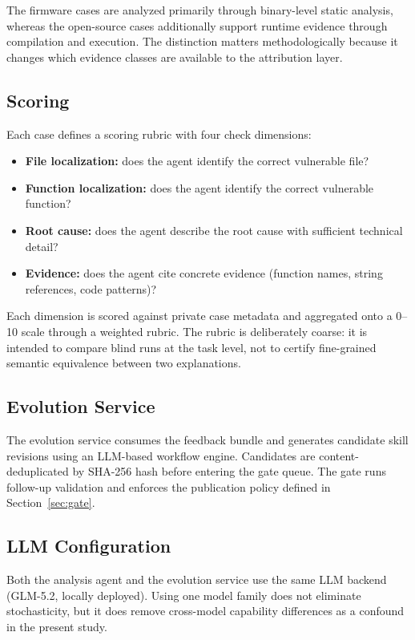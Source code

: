 ﻿\documentclass[preprint,12pt]{elsarticle}
\begin{document}
The firmware cases are analyzed primarily through binary-level static
analysis, whereas the open-source cases additionally support runtime
evidence through compilation and execution.  The distinction matters
methodologically because it changes which evidence classes are available to
the attribution layer.

\subsection{Scoring}

Each case defines a scoring rubric with four check dimensions:
\begin{itemize}[leftmargin=*]
    \item \textbf{File localization:} does the agent identify the correct
    vulnerable file?
    \item \textbf{Function localization:} does the agent identify the
    correct vulnerable function?
    \item \textbf{Root cause:} does the agent describe the root cause with
    sufficient technical detail?
    \item \textbf{Evidence:} does the agent cite concrete evidence
    (function names, string references, code patterns)?
\end{itemize}
Each dimension is scored against private case metadata and aggregated onto a
0--10 scale through a weighted rubric.  The rubric is deliberately coarse:
it is intended to compare blind runs at the task level, not to certify
fine-grained semantic equivalence between two explanations.

\subsection{Evolution Service}

The evolution service consumes the feedback bundle and generates candidate
skill revisions using an LLM-based workflow engine.  Candidates are
content-deduplicated by SHA-256 hash before entering the gate queue.  The
gate runs follow-up validation and enforces the publication policy defined
in Section~\ref{sec:gate}.

\subsection{LLM Configuration}

Both the analysis agent and the evolution service use the same LLM backend
(GLM-5.2, locally deployed).  Using one model family does not eliminate
stochasticity, but it does remove cross-model capability differences as a
confound in the present study.
\end{document}
